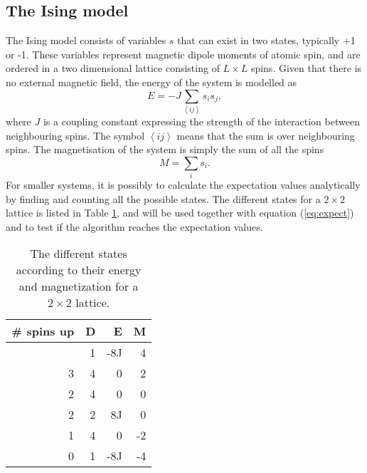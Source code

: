 \subsection{The Ising model}
The Ising model consists of variables $s$ that can exist in two states, typically +1 or -1. These variables represent magnetic dipole moments of atomic spin, and are ordered in a two dimensional lattice consisting of $L\times L$ spins. Given that there is no external magnetic field, the energy of the system is modelled as
\begin{equation}
E = -J\sum_{\left\langle ij\right\rangle } s_is_j,
\end{equation} 
where $J$ is a coupling constant expressing the strength of the interaction between neighbouring spins. The symbol $\left\langle ij\right\rangle$ means that the sum is over neighbouring spins. The magnetisation of the system is simply the sum of all the spins 
\begin{equation}
M = \sum_i s_i.
\end{equation}
For smaller systems, it is possibly to calculate the expectation values analytically by finding and counting all the possible states. The different states for a $2\times 2$ lattice is listed in Table \ref{tab:L2 values}, and will be used together with equation (\ref{eq:expect}) and to test if the algorithm reaches the expectation values.
\begin{table}[htbp]
	\centering
	\begin{tabular}{rrrr}
		\# spins up & D & E & M \\
		\hline
		\addlinespace[0.1cm]
		4                   & 1          & -8J    & 4             \\
		3                   & 4          & 0      & 2             \\
		2                   & 4          & 0      & 0             \\
		2                   & 2          & 8J     & 0             \\
		1                   & 4          & 0      & -2            \\
		0                   & 1          & -8J    & -4           
	\end{tabular}
	\caption{The different states according to their energy and magnetization for a $2\times 2$ lattice.}
	\label{tab:L2 values}
\end{table}

